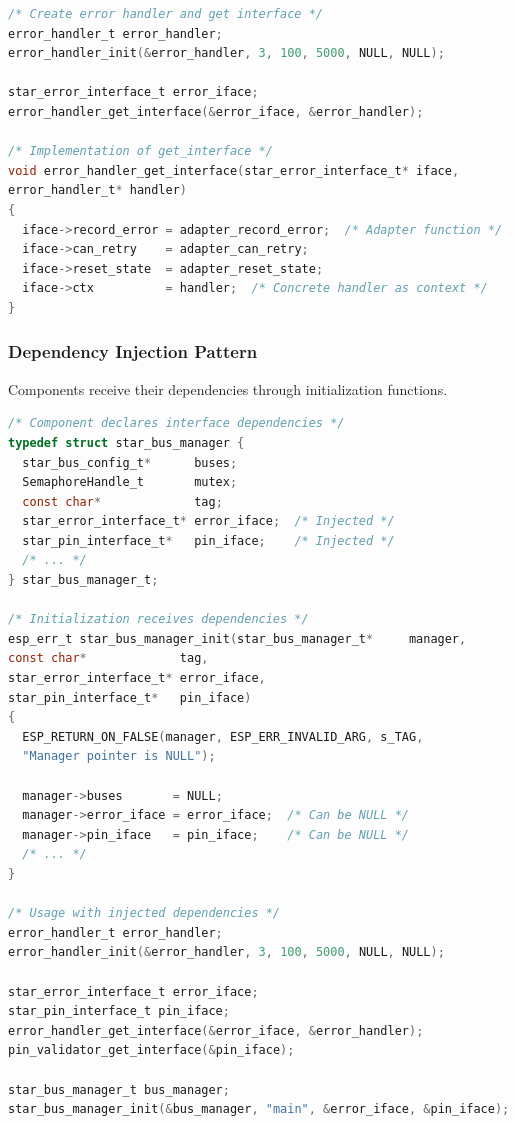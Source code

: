 \begin{lstlisting}[language=C]
/* Create error handler and get interface */
error_handler_t error_handler;
error_handler_init(&error_handler, 3, 100, 5000, NULL, NULL);

star_error_interface_t error_iface;
error_handler_get_interface(&error_iface, &error_handler);

/* Implementation of get_interface */
void error_handler_get_interface(star_error_interface_t* iface,
error_handler_t* handler)
{
  iface->record_error = adapter_record_error;  /* Adapter function */
  iface->can_retry    = adapter_can_retry;
  iface->reset_state  = adapter_reset_state;
  iface->ctx          = handler;  /* Concrete handler as context */
}
\end{lstlisting}

\subsubsection{Dependency Injection Pattern}

Components receive their dependencies through initialization functions.

\begin{lstlisting}[language=C]
/* Component declares interface dependencies */
typedef struct star_bus_manager {
  star_bus_config_t*      buses;
  SemaphoreHandle_t       mutex;
  const char*             tag;
  star_error_interface_t* error_iface;  /* Injected */
  star_pin_interface_t*   pin_iface;    /* Injected */
  /* ... */
} star_bus_manager_t;

/* Initialization receives dependencies */
esp_err_t star_bus_manager_init(star_bus_manager_t*     manager,
const char*             tag,
star_error_interface_t* error_iface,
star_pin_interface_t*   pin_iface)
{
  ESP_RETURN_ON_FALSE(manager, ESP_ERR_INVALID_ARG, s_TAG,
  "Manager pointer is NULL");
  
  manager->buses       = NULL;
  manager->error_iface = error_iface;  /* Can be NULL */
  manager->pin_iface   = pin_iface;    /* Can be NULL */
  /* ... */
}

/* Usage with injected dependencies */
error_handler_t error_handler;
error_handler_init(&error_handler, 3, 100, 5000, NULL, NULL);

star_error_interface_t error_iface;
star_pin_interface_t pin_iface;
error_handler_get_interface(&error_iface, &error_handler);
pin_validator_get_interface(&pin_iface);

star_bus_manager_t bus_manager;
star_bus_manager_init(&bus_manager, "main", &error_iface, &pin_iface);
\end{lstlisting}

